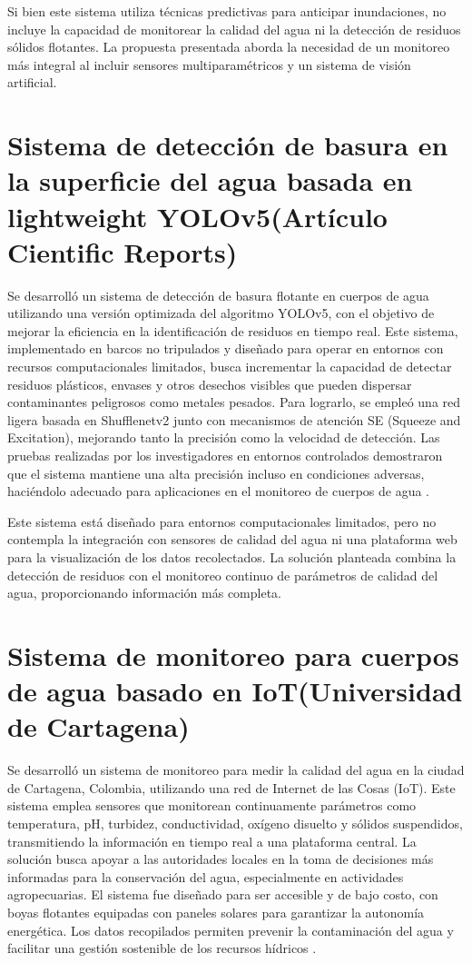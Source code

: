 Si bien este sistema utiliza técnicas predictivas para anticipar inundaciones, no incluye la capacidad de monitorear la calidad del agua ni la detección de residuos sólidos flotantes. La propuesta presentada aborda la necesidad de un monitoreo más integral al incluir sensores multiparamétricos y un sistema de visión artificial.

\section{Sistema de detección de basura en la superficie del agua basada en lightweight YOLOv5(Artículo Cientific Reports)}

Se desarrolló un sistema de detección de basura flotante en cuerpos de agua utilizando una versión optimizada del algoritmo YOLOv5, con el objetivo de mejorar la eficiencia en la identificación de residuos en tiempo real. Este sistema, implementado en barcos no tripulados y diseñado para operar en entornos con recursos computacionales limitados, busca incrementar la capacidad de detectar residuos plásticos, envases y otros desechos visibles que pueden dispersar contaminantes peligrosos como metales pesados. Para lograrlo, se empleó una red ligera basada en Shufflenetv2 junto con mecanismos de atención SE (Squeeze and Excitation), mejorando tanto la precisión como la velocidad de detección. Las pruebas realizadas por los investigadores en entornos controlados demostraron que el sistema mantiene una alta precisión incluso en condiciones adversas, haciéndolo adecuado para aplicaciones en el monitoreo de cuerpos de agua \cite{chen2024}.

Este sistema está diseñado para entornos computacionales limitados, pero no contempla la integración con sensores de calidad del agua ni una plataforma web para la visualización de los datos recolectados. La solución planteada combina la detección de residuos con el monitoreo continuo de parámetros de calidad del agua, proporcionando información más completa.

\section{Sistema de monitoreo para cuerpos de agua basado en IoT(Universidad de Cartagena)}

Se desarrolló un sistema de monitoreo para medir la calidad del agua en la ciudad de Cartagena, Colombia, utilizando una red de Internet de las Cosas (IoT). Este sistema emplea sensores que monitorean continuamente parámetros como temperatura, pH, turbidez, conductividad, oxígeno disuelto y sólidos suspendidos, transmitiendo la información en tiempo real a una plataforma central. La solución busca apoyar a las autoridades locales en la toma de decisiones más informadas para la conservación del agua, especialmente en actividades agropecuarias. El sistema fue diseñado para ser accesible y de bajo costo, con boyas flotantes equipadas con paneles solares para garantizar la autonomía energética. Los datos recopilados permiten prevenir la contaminación del agua y facilitar una gestión sostenible de los recursos hídricos \cite{lechuga2023}.

